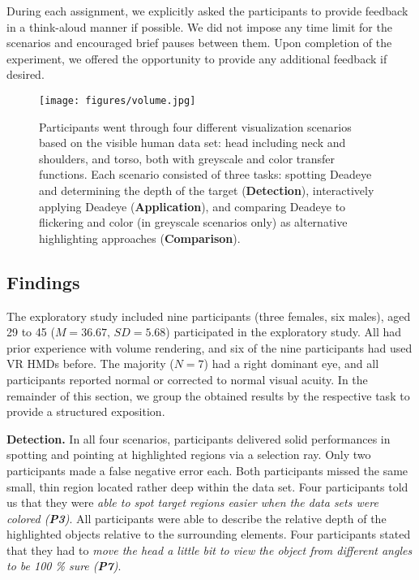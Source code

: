 \documentclass[journal]{vgtc}                %
\begin{document}
During each assignment, we explicitly asked the participants to provide feedback in a think-aloud manner if possible. We did not impose any time limit for the scenarios and encouraged brief pauses between them. Upon completion of the experiment, we offered the opportunity to provide any additional feedback if desired.



\begin{figure}[t!]
\centering
\texttt{[image: figures/volume.jpg]}
\caption{Participants went through four different visualization scenarios based on the visible human data set: head including neck and shoulders, and torso, both with greyscale and color transfer functions. Each scenario consisted of three tasks: spotting Deadeye and determining the depth of the target (\textbf{Detection}), interactively applying Deadeye (\textbf{Application}), and comparing Deadeye to flickering and color (in greyscale scenarios only) as alternative highlighting approaches (\textbf{Comparison}).}
\label{fig:volume}
\end{figure}


\subsection{Findings}

The exploratory study included nine participants (three females, six males), aged 29 to 45 ($M = 36.67,\,SD = 5.68$) participated in the exploratory study. All had prior experience with volume rendering, and six of the nine participants had used VR HMDs before. The majority ($N = 7$) had a right dominant eye, and all participants reported normal or corrected to normal visual acuity. In the remainder of this section, we group the obtained results by the respective task to provide a structured exposition.


\textbf{Detection.} In all four scenarios, participants delivered solid performances in spotting and pointing at highlighted regions via a selection ray. Only two participants made a false negative error each. Both participants missed the same small, thin region located rather deep within the data set. Four participants told us that they were \textit{able to spot target regions easier when the data sets were colored (\textbf{P3})}. All participants were able to describe the relative depth of the highlighted objects relative to the surrounding elements. Four participants stated that they had to \textit{move the head a little bit to view the object from different angles to be 100 \% sure (\textbf{P7})}.
\end{document}
